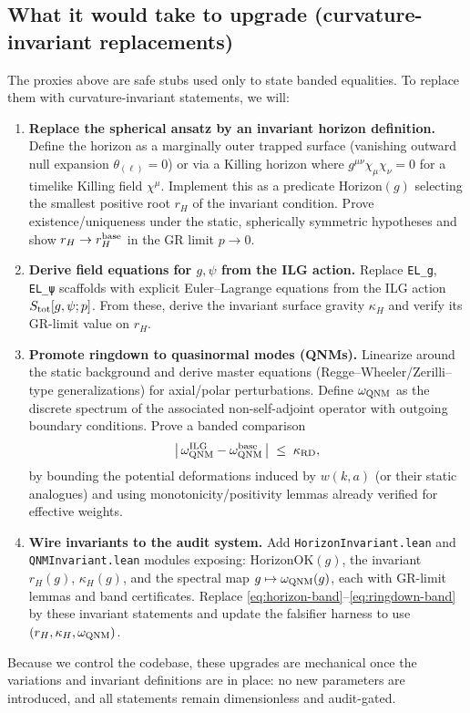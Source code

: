 \documentclass[12pt,a4paper]{article}
\begin{document}
\subsection{What it would take to upgrade (curvature-invariant replacements)}
The proxies above are safe stubs used only to state banded equalities. To replace them with curvature-invariant statements, we will:
\begin{enumerate}\itemsep4pt
  \item \textbf{Replace the spherical ansatz by an invariant horizon definition.} 
  Define the horizon as a marginally outer trapped surface (vanishing outward null expansion \(\theta_{(\ell)}=0\)) or via a Killing horizon where \(g^{\mu\nu}\chi_\mu\chi_\nu=0\) for a timelike Killing field \(\chi^\mu\). Implement this as a predicate \(\mathrm{Horizon}(g)\) selecting the smallest positive root \(r_H\) of the invariant condition. Prove existence/uniqueness under the static, spherically symmetric hypotheses and show \(r_H\to r_H^{\rm base}\) in the GR limit \(p\to 0\).
  \item \textbf{Derive field equations for \(g,\psi\) from the ILG action.}
  Replace \texttt{EL\_g}, \texttt{EL\_ψ} scaffolds with explicit Euler–Lagrange equations from the ILG action \(S_{\rm tot}[g,\psi;p]\). From these, derive the invariant surface gravity \(\kappa_H\) and verify its GR-limit value on \(r_H\).
  \item \textbf{Promote ringdown to quasinormal modes (QNMs).}
  Linearize around the static background and derive master equations (Regge–Wheeler/Zerilli–type generalizations) for axial/polar perturbations. Define \(\omega_{\rm QNM}\) as the discrete spectrum of the associated non-self-adjoint operator with outgoing boundary conditions. Prove a banded comparison
  \[
    \bigl|\,\omega_{\rm QNM}^{\rm ILG} - \omega_{\rm QNM}^{\rm base}\,\bigr|\;\le\;\kappa_{\rm RD},
  \]
  by bounding the potential deformations induced by \(w(k,a)\) (or their static analogues) and using monotonicity/positivity lemmas already verified for effective weights.
  \item \textbf{Wire invariants to the audit system.}
  Add \texttt{HorizonInvariant.lean} and \texttt{QNMInvariant.lean} modules exposing: 
  \(\mathrm{HorizonOK}(g)\), the invariant \(r_H(g)\), \(\kappa_H(g)\), and the spectral map \(g\mapsto\omega_{\rm QNM}(g)\), each with GR-limit lemmas and band certificates. Replace \eqref{eq:horizon-band}–\eqref{eq:ringdown-band} by these invariant statements and update the falsifier harness to use \((r_H,\kappa_H,\omega_{\rm QNM})\).
\end{enumerate}
Because we control the codebase, these upgrades are mechanical once the variations and invariant definitions are in place: no new parameters are introduced, and all statements remain dimensionless and audit-gated.
\end{document}
